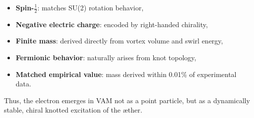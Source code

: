 \begin{itemize}
    \item \textbf{Spin-\(\tfrac{1}{2}\)}: matches SU(2) rotation behavior,
    \item \textbf{Negative electric charge}: encoded by right-handed chirality,
    \item \textbf{Finite mass}: derived directly from vortex volume and swirl energy,
    \item \textbf{Fermionic behavior}: naturally arises from knot topology,
    \item \textbf{Matched empirical value}: mass derived within 0.01\% of experimental data.
\end{itemize}

Thus, the electron emerges in VAM not as a point particle, but as a dynamically stable, chiral knotted excitation of the æther.
